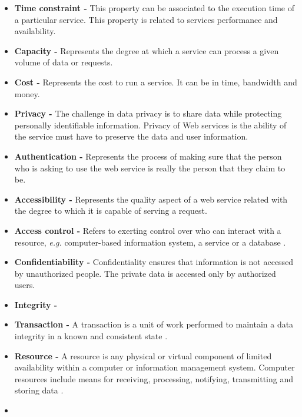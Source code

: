 \begin{itemize}
%   
  \item \textbf{Time constraint -} This property can be associated to
  the execution time of a particular service. This property is related
  to services performance and availability.  
  \item \textbf{Capacity -} Represents the degree at which a service can
  process a given volume of data or requests.
  \item \textbf{Cost -} Represents the cost to run a service. It can be in
   time, bandwidth and money.
  \item \textbf{Privacy -}  The challenge in data privacy is to share
  data while protecting personally identifiable information. Privacy of
  Web services is the ability of the service must have to preserve the data and
  user information. 
  \item \textbf{Authentication -} Represents the process of making sure
  that the person who is asking to use the web service is really the person that
  they claim to be. 
  \item \textbf{Accessibility -} Represents the quality aspect of a web
  service related with the degree to which it is capable of serving a
 request. 
  \item \textbf{Access control -} Refers to exerting control over who can
  interact with a resource, \textit{e.g.} computer-based information system, a
  service or a database \cite{Adiba:1981}. 
  \item \textbf{Confidentiability -} Confidentiality ensures that
  information is not accessed by unauthorized people. The private data is
  accessed only by authorized users. 
  \item \textbf{Integrity -} 
   \item \textbf{Transaction -} A transaction is a unit of work performed
  to maintain a data integrity in a known and consistent state \cite{Adiba:1981}.
  \item \textbf{Resource -} A resource is any physical or virtual
  component of limited availability within a computer or information management
  system. Computer resources include means for receiving, processing, notifying,
  transmitting and storing data \cite{Adiba:1981}. 
 \item {}
\end{itemize}  



